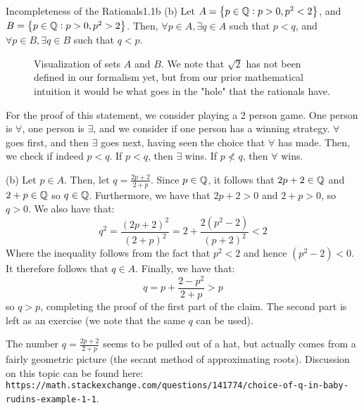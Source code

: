 \begin{example}{Incompleteness of the Rationals}{1.1b}
    (b) Let $A = \set{p \in \mathbb{Q}: p > 0, p^2 < 2}$, and $B = \set{p \in \mathbb{Q}: p > 0, p^2 > 2}$. Then, $\forall p \in A, \exists q \in A$ such that $p < q$, and $\forall p \in B, \exists q \in B$ such that $q < p$. 
\end{example}
\begin{figure}[htbp]
    \centering
    \caption{Visualization of sets $A$ and $B$. We note that $\sqrt{2}$ has not been defined in our formalism yet, but from our prior mathematical intuition it would be what goes in the "hole" that the rationals have.}
    \label{<label>}
\end{figure}

For the proof of this statement, we consider playing a 2 person game. One person is $\forall$, one person is $\exists$, and we consider if one person has a winning strategy. $\forall$ goes first, and then $\exists$ goes next, having seen the choice that $\forall$ has made. Then, we check if indeed $p < q$. If $p < q$, then $\exists$ wins. If $p \not< q$, then $\forall$ wins. 

\begin{nproof}
    (b) Let $p \in A$. Then, let $q = \frac{2p + 2}{2 + p}$. Since $p \in \mathbb{Q}$, it follows that $2p + 2 \in \mathbb{Q}$ and $2 + p \in \mathbb{Q}$ so $q \in \mathbb{Q}$. Furthermore, we have that $2p + 2 > 0$ and $2 + p > 0$, so $q > 0$. We also have that:
    \[q^2 = \frac{(2p+2)^2}{(2+p)^2} = 2 + \frac{2(p^2 - 2)}{(p+2)^2} < 2\]
    Where the inequality follows from the fact that $p^2 < 2$ and hence $(p^2 - 2) < 0$. It therefore follows that $q \in A$. Finally, we have that:
    \[q = p + \frac{2-p^2}{2+p} > p\]
    so $q > p$, completing the proof of the first part of the claim. The second part is left as an exercise (we note that the same $q$ can be used).
\end{nproof}

The number $q = \frac{2p+ 2}{2 + p}$ seems to be pulled out of a hat, but actually comes from a fairly geometric picture (the secant method of approximating roots). Discussion on this topic can be found here: \texttt{https://math.stackexchange.com/questions/141774/choice-of-q-in-baby-rudins-example-1-1}.

